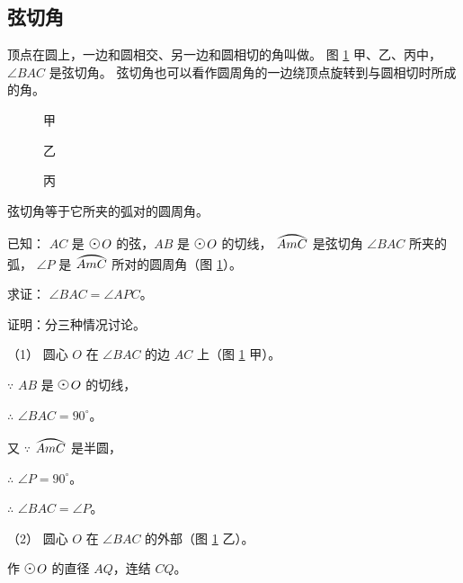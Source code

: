 \subsection{弦切角}\label{subsec:czjh2-7-11}

顶点在圆上，一边和圆相交、另一边和圆相切的角叫做。
图 \ref{fig:czjh2-7-41} 甲、乙、丙中，$\angle BAC$ 是弦切角。
弦切角也可以看作圆周角的一边绕顶点旋转到与圆相切时所成的角。

\begin{figure}[htbp]
    \centering
    \begin{minipage}[b]{4.5cm}
        \centering
        
        \caption*{甲}
    \end{minipage}
    \qquad
    \begin{minipage}[b]{4.7cm}
        \centering
        
        \caption*{乙}
    \end{minipage}
    \qquad
    \begin{minipage}[b]{4.5cm}
        \centering
        
        \caption*{丙}
    \end{minipage}
    \caption{}\label{fig:czjh2-7-41}
\end{figure}

\begin{dingli}[弦切角定理]
    弦切角等于它所夹的弧对的圆周角。
\end{dingli}

已知： $AC$ 是 $\yuan\,O$ 的弦，$AB$ 是 $\yuan\,O$ 的切线，
$\yuanhu{AmC}$ 是弦切角 $\angle BAC$ 所夹的弧，
$\angle P$ 是 $\yuanhu{AmC}$ 所对的圆周角（图 \ref{fig:czjh2-7-41}）。

求证： $\angle BAC = \angle APC$。

证明：分三种情况讨论。

（1） 圆心 $O$ 在 $\angle BAC$ 的边 $AC$ 上（图 \ref{fig:czjh2-7-41} 甲）。

$\because$ \quad $AB$ 是 $\yuan\,O$ 的切线，

$\therefore$ \quad $\angle BAC = 90^\circ$。

又 $\because$ \quad $\yuanhu{AmC}$ 是半圆，

$\therefore$ \quad $\angle P = 90^\circ$。

$\therefore$ \quad $\angle BAC = \angle P$。

（2） 圆心 $O$ 在 $\angle BAC$ 的外部（图 \ref{fig:czjh2-7-41} 乙）。

作 $\yuan\,O$ 的直径 $AQ$，连结 $CQ$。

